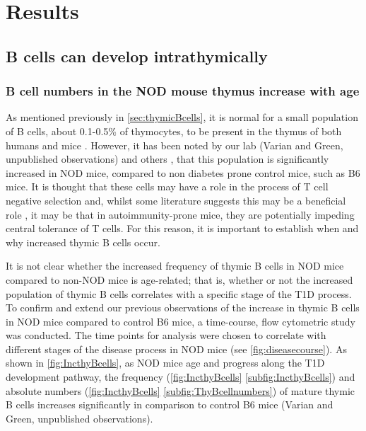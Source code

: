 
\chapter{Results}

\section{B cells can develop intrathymically}

\subsection{B cell numbers in the NOD mouse thymus increase with age}

As mentioned previously in \cref{sec:thymicBcells}, it is normal for a small population of B cells, about 0.1-0.5\% of thymocytes, to be present in the thymus of both humans and mice \citep{Perera2013}.
However, it has been noted by our lab (Varian and Green, unpublished observations) and others \citep{OReilly1994}, that this population is significantly increased in NOD mice, compared to non diabetes prone control mice, such as B6 mice.
It is thought that these cells may have a role in the process of T cell negative selection and, whilst some literature suggests this may be a beneficial role \citep{Frommer2010, Perera2013}, it may be that in autoimmunity-prone mice, they are potentially impeding central tolerance of T cells.
For this reason, it is important to establish when and why increased thymic B cells occur.


It is not clear whether the increased frequency of thymic B cells in NOD mice compared to non-NOD mice is age-related; that is, whether or not the increased population of thymic B cells correlates with a specific stage of the T1D process.
To confirm and extend our previous observations of the increase in thymic B cells in NOD mice compared to control B6 mice, a time-course, flow cytometric study was conducted. %
The time points for analysis were chosen to correlate with different stages of the disease process in NOD mice (see \cref{fig:diseasecourse}).
As shown in \cref{fig:IncthyBcells}, as NOD mice age and progress along the T1D development pathway, the frequency (\cref{fig:IncthyBcells} \ref{subfig:IncthyBcells}) and absolute numbers (\cref{fig:IncthyBcells} \ref{subfig:ThyBcellnumbers}) of mature thymic B cells increases significantly in comparison to control B6 mice (Varian and Green, unpublished observations). 


